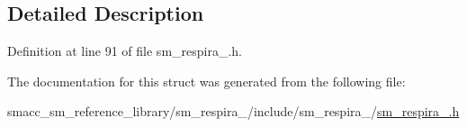 \subsection{Detailed Description}


Definition at line 91 of file sm\+\_\+respira\+\_.\+h.



The documentation for this struct was generated from the following file\+:\begin{DoxyCompactItemize}
\item 
smacc\+\_\+sm\+\_\+reference\+\_\+library/sm\+\_\+respira\+\_/include/sm\+\_\+respira\+\_/\hyperlink{sm__respira__1_8h}{sm\+\_\+respira\+\_.\+h}\end{DoxyCompactItemize}
